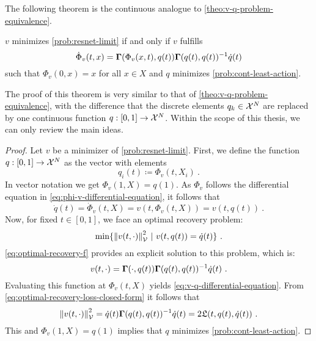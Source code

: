 The following theorem is the continuous analogue to \cref{theo:v-q-problem-equivalence}.
\begin{theorem}
	\label{theo:v-q-continuous-problem-equivalence}
	$v$ minimizes \cref{prob:resnet-limit} if and only if $v$ fulfills
	\begin{equation}
			\label{eq:v-q-differential-equation}
			\dot{\Phi}_v(t, x) = \mathbf{\Gamma}(\Phi_v(x, t), q(t)) \mathbf{\Gamma}(q(t), q(t))^{-1} \dot{q}(t)
	\end{equation}
	such that $\Phi_v(0, x) = x$ for all $x \in X$ and $q$ minimizes \cref{prob:cont-least-action}.
\end{theorem}
The proof of this theorem is very similar to that of \cref{theo:v-q-problem-equivalence}, with the difference that the discrete elements $q_k \in \mathcal{X}^N$ are replaced by one continuous function $q: [0, 1] \rightarrow \mathcal{X}^N$.
Within the scope of this thesis, we can only review the main ideas.
\begin{proof}
	Let $v$ be a minimizer of \cref{prob:resnet-limit}.
	First, we define the function $q: [0, 1] \rightarrow \mathcal{X}^N$ as the vector with elements
	\begin{equation}
		q_i(t) \coloneqq \Phi_v(t, X_i) \ .
	\end{equation}
	In vector notation we get $\Phi_v(1, X) = q(1)$.
	As $\Phi_v$ follows the differential equation in \ref{eq:phi-v-differential-equation}, it follows that 
	\begin{equation}
		\dot{q}(t) = \dot{\Phi}_v(t, X) = v(t, \Phi_v(t, X)) = v(t, q(t)) \ .
	\end{equation}
	Now, for fixed $t \in [0, 1]$, we face an optimal recovery problem:
	\begin{equation}
		\min\{\norm{v(t, \cdot)}_{\mathcal{V}}^2\ |\ v(t, q(t)) = \dot{q}(t)\} \ .
	\end{equation}
	\cref{eq:optimal-recovery-f} provides an explicit solution to this problem, which is:
	\begin{equation}
		v(t, \cdot) = \mathbf{\Gamma}(\cdot, q(t))\mathbf{\Gamma}(q(t), q(t))^{-1}\dot{q}(t) \ .
	\end{equation}
	Evaluating this function at $\Phi_v(t, X)$ yields \cref{eq:v-q-differential-equation}.
	From \cref{eq:optimal-recovery-loss-closed-form} it follows that 
	\begin{equation}
		\norm{v(t, \cdot)}_{\mathcal{V}}^2 = \dot{q}(t) \mathbf{\Gamma}(q(t), q(t))^{-1} \dot{q}(t) = 2 \mathfrak{L}(t, q(t), \dot{q}(t))  \ .
	\end{equation}
	This and $\Phi_v(1, X) = q(1)$ implies that $q$ minimizes \cref{prob:cont-least-action}.
\end{proof}


